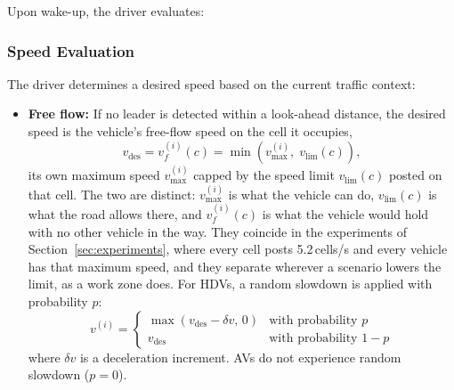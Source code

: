 \documentclass[review,authoryear]{elsarticle}
\begin{document}
Upon wake-up, the driver evaluates:

\subsubsection{Speed Evaluation}
\label{sec:speed_eval}

The driver determines a desired speed based on the current traffic context:

\begin{itemize}
    \item \textbf{Free flow:} If no leader is detected within a look-ahead distance, the desired speed is the vehicle's free-flow speed on the cell it occupies,
    \begin{equation}
        v_{\text{des}} = v_f^{(i)}(c) = \min\!\left(v_{\max}^{(i)},\; v_{\text{lim}}(c)\right),
        \label{eq:free_flow_speed}
    \end{equation}
    its own maximum speed $v_{\max}^{(i)}$ capped by the speed limit $v_{\text{lim}}(c)$ posted on that cell. The two are distinct: $v_{\max}^{(i)}$ is what the vehicle can do, $v_{\text{lim}}(c)$ is what the road allows there, and $v_f^{(i)}(c)$ is what the vehicle would hold with no other vehicle in the way. They coincide in the experiments of Section~\ref{sec:experiments}, where every cell posts 5.2\,cells/s and every vehicle has that maximum speed, and they separate wherever a scenario lowers the limit, as a work zone does. For HDVs, a random slowdown is applied with probability $p$:
    \begin{equation}
        v^{(i)} = \begin{cases}
            \max(v_{\text{des}} - \delta v,\, 0) & \text{with probability } p \\
            v_{\text{des}} & \text{with probability } 1 - p
        \end{cases}
        \label{eq:free_flow}
    \end{equation}
    where $\delta v$ is a deceleration increment. AVs do not experience random slowdown ($p = 0$).


\end{itemize}
\end{document}
